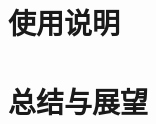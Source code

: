 \documentclass{source/Report}
\begin{document}
\section{使用说明}

\section{总结与展望}







\end{document}
